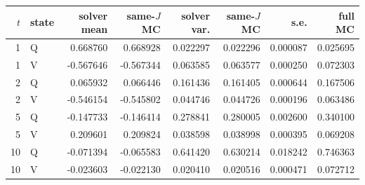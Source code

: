 \begin{tabular}{rlrrrrrr}\toprule
$t$ & state & solver mean & same-$J$ MC & solver var. & same-$J$ MC & s.e. & full MC\\\midrule
1 & Q & 0.668760 & 0.668928 & 0.022297 & 0.022296 & 0.000087 & 0.025695\\
1 & V & -0.567646 & -0.567344 & 0.063585 & 0.063577 & 0.000250 & 0.072303\\
2 & Q & 0.065932 & 0.066446 & 0.161436 & 0.161405 & 0.000644 & 0.167506\\
2 & V & -0.546154 & -0.545802 & 0.044746 & 0.044726 & 0.000196 & 0.063486\\
5 & Q & -0.147733 & -0.146414 & 0.278841 & 0.280005 & 0.002600 & 0.340100\\
5 & V & 0.209601 & 0.209824 & 0.038598 & 0.038998 & 0.000395 & 0.069208\\
10 & Q & -0.071394 & -0.065583 & 0.641420 & 0.630214 & 0.018242 & 0.746363\\
10 & V & -0.023603 & -0.022130 & 0.020410 & 0.020516 & 0.000471 & 0.072712\\
\bottomrule\end{tabular}

